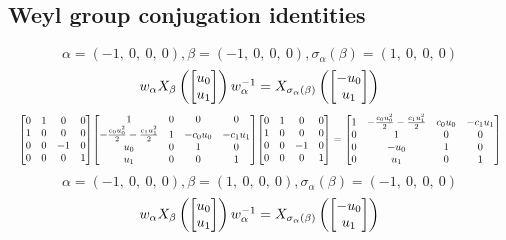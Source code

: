 \documentclass[11pt]{article}
\theoremstyle{definition}
\begin{document}
\subsection{Weyl group conjugation identities}

\providecommand{\scaletoalign}[2]{%
  \sbox0{$#2$}%
  \ifdim\wd0>#1\relax 
    \resizebox{#1}{!}{\usebox0}%
  \else 
    \usebox0%
  \fi 
}
\[
\alpha = \left( -1, \  0, \  0, \  0\right), \beta = \left( -1, \  0, \  0, \  0\right), \sigma_{\alpha}(\beta) = \left( 1, \  0, \  0, \  0\right)
\]
\[
\scaletoalign{\textwidth}{w_{\alpha} X_{\beta}\left(\left[\begin{matrix}u_{0}\\u_{1}\end{matrix}\right]\right) w_{\alpha}^{-1} = X_{\sigma_{\alpha}\left(\beta\right)}\left(\left[\begin{matrix}- u_{0}\\u_{1}\end{matrix}\right]\right)}
\]
\[
\scaletoalign{\textwidth}{{\left[\begin{matrix}0 & 1 & 0 & 0\\1 & 0 & 0 & 0\\0 & 0 & -1 & 0\\0 & 0 & 0 & 1\end{matrix}\right]} {\left[\begin{matrix}1 & 0 & 0 & 0\\- \frac{c_{0} u_{0}^{2}}{2} - \frac{c_{1} u_{1}^{2}}{2} & 1 & - c_{0} u_{0} & - c_{1} u_{1}\\u_{0} & 0 & 1 & 0\\u_{1} & 0 & 0 & 1\end{matrix}\right]} {\left[\begin{matrix}0 & 1 & 0 & 0\\1 & 0 & 0 & 0\\0 & 0 & -1 & 0\\0 & 0 & 0 & 1\end{matrix}\right]} = {\left[\begin{matrix}1 & - \frac{c_{0} u_{0}^{2}}{2} - \frac{c_{1} u_{1}^{2}}{2} & c_{0} u_{0} & - c_{1} u_{1}\\0 & 1 & 0 & 0\\0 & - u_{0} & 1 & 0\\0 & u_{1} & 0 & 1\end{matrix}\right]}}
\]
\[
\alpha = \left( -1, \  0, \  0, \  0\right), \beta = \left( 1, \  0, \  0, \  0\right), \sigma_{\alpha}(\beta) = \left( -1, \  0, \  0, \  0\right)
\]
\[
\scaletoalign{\textwidth}{w_{\alpha} X_{\beta}\left(\left[\begin{matrix}u_{0}\\u_{1}\end{matrix}\right]\right) w_{\alpha}^{-1} = X_{\sigma_{\alpha}\left(\beta\right)}\left(\left[\begin{matrix}- u_{0}\\u_{1}\end{matrix}\right]\right)}
\]
\end{document}
